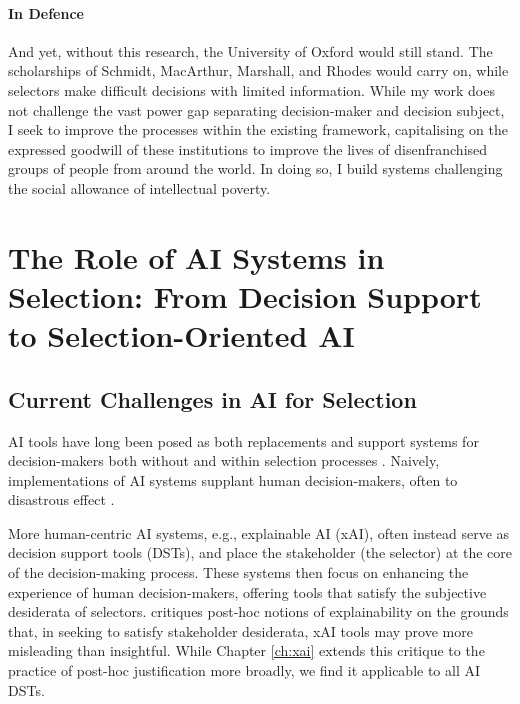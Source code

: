 \paragraph{In Defence}
And yet, without this research, the University of Oxford would still stand. The scholarships of Schmidt, MacArthur, Marshall, and Rhodes would carry on, while selectors make difficult decisions with limited information. While my work does not challenge the vast power gap separating decision-maker and decision subject, I seek to improve the processes within the existing framework, capitalising on the expressed goodwill of these institutions to improve the lives of disenfranchised groups of people from around the world. In doing so, I build systems challenging the social allowance of intellectual poverty.

\section{The Role of AI Systems in Selection: From Decision Support to Selection-Oriented AI}
\subsection{Current Challenges in AI for Selection}
AI tools have long been posed as both replacements and support systems for decision-makers both without and within selection processes \cite{barocas_big_2016,jacobs_how_2021,hildebrandt_law_nodate,yarger2020algorithmic,mattu_how_nodate}. Naively, implementations of AI systems supplant human decision-makers, often to disastrous effect \cite{mattu_how_nodate}.

More human-centric AI systems, e.g., explainable AI (xAI), often instead serve as decision support tools (DSTs), and place the stakeholder (the selector) at the core of the decision-making process. These systems then focus on enhancing the experience of human decision-makers, offering tools that satisfy the subjective desiderata of selectors. \textcite{Lipton} critiques post-hoc notions of explainability on the grounds that, in seeking to satisfy stakeholder desiderata, xAI tools may prove more misleading than insightful. While Chapter \ref{ch:xai} extends this critique to the practice of post-hoc justification more broadly, we find it applicable to all AI DSTs.


